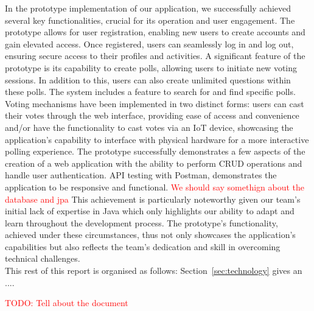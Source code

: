 \noindent In the prototype implementation of our application, we successfully achieved several key functionalities, crucial for its operation and user engagement. The prototype allows for user registration, enabling new users to create accounts and gain elevated access. Once registered, users can seamlessly log in and log out, ensuring secure access to their profiles and activities. A significant feature of the prototype is its capability to create polls, allowing users to initiate new voting sessions. In addition to this, users can also create unlimited questions within these polls. The system includes a feature to search for and find specific polls. Voting mechanisms have been implemented in two distinct forms: users can cast their votes through the web interface, providing ease of access and convenience and/or  have the functionality to cast votes via an IoT device, showcasing the application's capability to interface with physical hardware for a more interactive polling experience.  The prototype successfully demonstrates a few aspects of the creation of a web application with the ability to perform CRUD operations and handle user authentication.  API testing with Postman, demonstrates the application to be responsive and functional. \textcolor{red}{We should say somethign about the database and jpa} This achievement is particularly noteworthy given our team's initial lack of expertise in Java which only highlights our ability to adapt and learn throughout the development process. The prototype's functionality, achieved under these circumstances, thus not only showcases the application's capabilities but also reflects the team's dedication and skill in overcoming technical challenges.\\


\noindent This rest of this report is organised as follows:
Section~\ref{sec:technology} gives an ....


\textcolor{red}{TODO: Tell about the document}

